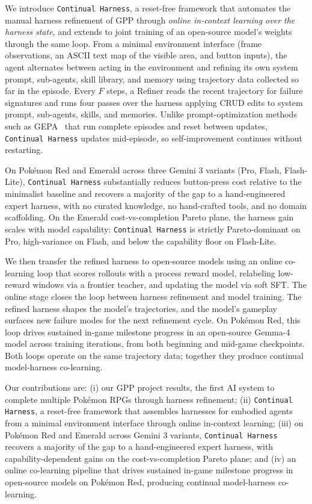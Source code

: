 We introduce \texttt{Continual Harness}, a reset-free framework that automates the manual harness refinement of GPP through \emph{online in-context learning over the harness state}, and extends to joint training of an open-source model's weights through the same loop. From a minimal environment interface (frame observations, an ASCII text map of the visible area, and button inputs), the agent alternates between acting in the environment and refining its own system prompt, sub-agents, skill library, and memory using trajectory data collected so far in the episode. Every $F$ steps, a Refiner reads the recent trajectory for failure signatures and runs four passes over the harness applying CRUD edits to system prompt, sub-agents, skills, and memories. Unlike prompt-optimization methods such as GEPA~\citep{agrawal2025gepa} that run complete episodes and reset between updates, \texttt{Continual Harness} updates mid-episode, so self-improvement continues without restarting.

On Pok\'{e}mon Red and Emerald across three Gemini 3 variants (Pro, Flash, Flash-Lite), \texttt{Continual Harness} substantially reduces button-press cost relative to the minimalist baseline and recovers a majority of the gap to a hand-engineered expert harness, with no curated knowledge, no hand-crafted tools, and no domain scaffolding. On the Emerald cost-vs-completion Pareto plane, the harness gain scales with model capability: \texttt{Continual Harness} is strictly Pareto-dominant on Pro, high-variance on Flash, and below the capability floor on Flash-Lite.

We then transfer the refined harness to open-source models using an online co-learning loop that scores rollouts with a process reward model, relabeling low-reward windows via a frontier teacher, and updating the model via soft SFT. The online stage closes the loop between harness refinement and model training. The refined harness shapes the model's trajectories, and the model's gameplay surfaces new failure modes for the next refinement cycle. On Pok\'{e}mon Red, this loop drives sustained in-game milestone progress in an open-source Gemma-4 model across training iterations, from both beginning and mid-game checkpoints. Both loops operate on the same trajectory data; together they produce continual model-harness co-learning.

Our contributions are: (i) our GPP project results, the first AI system to complete multiple Pok\'{e}mon RPGs through harness refinement; (ii) \texttt{Continual Harness}, a reset-free framework that assembles harnesses for embodied agents from a minimal environment interface through online in-context learning; (iii) on Pok\'{e}mon Red and Emerald across Gemini 3 variants, \texttt{Continual Harness} recovers a majority of the gap to a hand-engineered expert harness, with capability-dependent gains on the cost-vs-completion Pareto plane; and (iv) an online co-learning pipeline that drives sustained in-game milestone progress in open-source models on Pok\'{e}mon Red, producing continual model-harness co-learning.